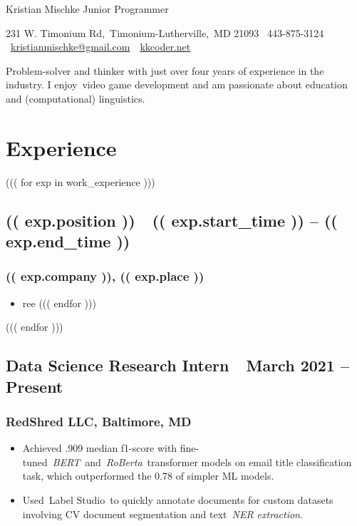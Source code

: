 \documentclass[letterpaper]{article}
\title{}
\author{Kristian Mischke}
\date{2021-05-15}
\newcommand\textstyleHeadingivChar[1]{\textit{\textcolor[rgb]{0.6784314,0.30980393,0.05882353}{#1}}}
\newcommand\textstyleToolPrimaryChar[1]{\textcolor[rgb]{0.18039216,0.45490196,0.70980394}{#1}}
\newcommand\liststyleLFOii{%
\renewcommand\labelitemi{{}-}
\renewcommand\labelitemii{o}
\renewcommand\labelitemiii{${\blacksquare}$}
\renewcommand\labelitemiv{{\textbullet}}
}
\begin{document}
\clearpage\clearpage\pagestyle{MP}
{\color[rgb]{0.26666668,0.44705883,0.76862746}
Kristian Mischke}
{\color[rgb]{0.3529412,0.3529412,0.3529412}
Junior Programmer}

231 W. Timonium Rd,\ Timonium-Lutherville,\ MD 21093\ {\textbar} 443-875-3124
{\textbar}\ \href{mailto:kristianmischke@gmail.com}{\textcolor[rgb]{0.019607844,0.3882353,0.75686276}{kristianmischke@gmail.com}}\ {\textbar}\ \href{http://kkcoder.net}{\textcolor[rgb]{0.019607844,0.3882353,0.75686276}{kkcoder.net}}

Problem-solver and thinker with just over four years of experience in the industry. I enjoy\ video game development and am passionate about education and (computational) linguistics.
\section{Experience}

((( for exp in work_experience )))
\subsection[(( exp.position ))\ \ (( exp.start_time )) {}-- (( exp.end_time ))]{(( exp.position ))\ \ (( exp.start_time )) {}--
(( exp.end_time ))}
\subsubsection{(( exp.company )), (( exp.place ))}
\liststyleLFOii
\begin{itemize}
((( for resp in exp.responsibilities )))
\item ree
((( endfor )))
\end{itemize}
((( endfor )))

\subsection[Data Science Research Intern\ \ March 2021 {}-- Present]{Data Science Research Intern\ \ March 2021 --
Present}
\subsubsection{RedShred LLC, Baltimore, MD}
\liststyleLFOii
\begin{itemize}
\item Achieved .909 median f1-score with
fine-tuned\ \textstyleHeadingivChar{BERT}\ and\ \textstyleHeadingivChar{RoBerta}\ transformer models on email title
classification task, which outperformed the 0.78 of simpler ML models.
\item Used\ \textstyleToolPrimaryChar{Label Studio}\ to quickly annotate documents for custom datasets involving CV
document segmentation and text\ \textstyleHeadingivChar{NER extraction}.
\end{itemize}
\end{document}

